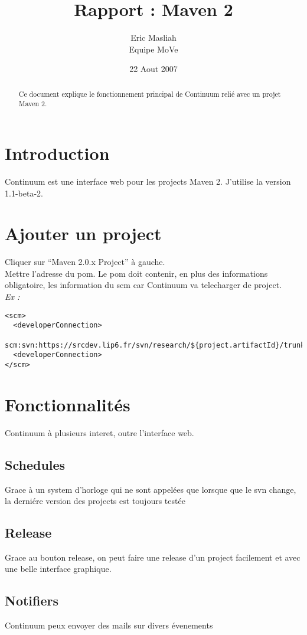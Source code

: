 \documentclass[a4paper,10pt]{article}
\title{Rapport : Maven 2}
\author{Eric Masliah\\
Equipe MoVe}
\date{22 Aout 2007}
\begin{document}
\maketitle

\begin{abstract}
Ce document explique le fonctionnement principal de Continuum relié avec un projet Maven 2.
\end{abstract}

\section{Introduction}
Continuum est une interface web pour les projects Maven 2. J'utilise la version 1.1-beta-2.

\section{Ajouter un project}
Cliquer sur ``Maven 2.0.x Project'' à gauche.\\
Mettre l'adresse du pom. Le pom doit contenir, en plus des informations obligatoire, les information du scm car Continuum va telecharger de project.\\
\textit{Ex : }
\begin{verbatim}
<scm>
  <developerConnection>
     scm:svn:https://srcdev.lip6.fr/svn/research/${project.artifactId}/trunk
  <developerConnection>
</scm>
\end{verbatim}

\section{Fonctionnalités}
Continuum à plusieurs interet, outre l'interface web.

\subsection{Schedules}
Grace à un system d'horloge qui ne sont appelées que lorsque que le svn change, la derniére version des projects est toujours testée

\subsection{Release}
Grace au bouton release, on peut faire une release d'un project facilement et avec une belle interface graphique.

\subsection{Notifiers}
Continuum peux envoyer des mails sur divers évenements
\end{document}

